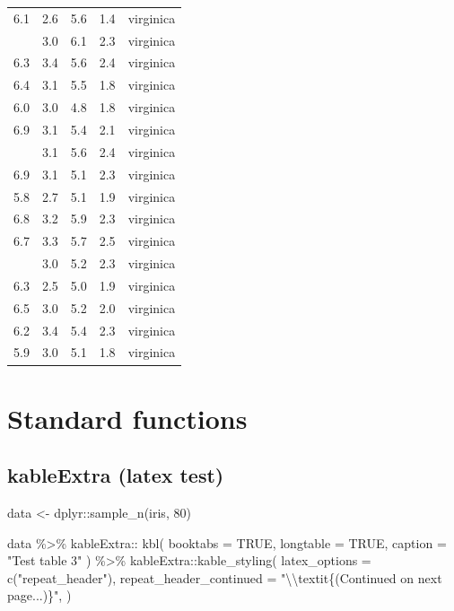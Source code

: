 \documentclass[
]{article}
\newenvironment{Shaded}{\begin{snugshade}}{\end{snugshade}}
\newcommand{\AttributeTok}[1]{\textcolor[rgb]{0.40,0.45,0.13}{#1}}
\newcommand{\ConstantTok}[1]{\textcolor[rgb]{0.56,0.35,0.01}{#1}}
\newcommand{\DecValTok}[1]{\textcolor[rgb]{0.68,0.00,0.00}{#1}}
\newcommand{\FunctionTok}[1]{\textcolor[rgb]{0.28,0.35,0.67}{#1}}
\newcommand{\NormalTok}[1]{\textcolor[rgb]{0.00,0.23,0.31}{#1}}
\newcommand{\OtherTok}[1]{\textcolor[rgb]{0.00,0.23,0.31}{#1}}
\newcommand{\SpecialCharTok}[1]{\textcolor[rgb]{0.37,0.37,0.37}{#1}}
\newcommand{\StringTok}[1]{\textcolor[rgb]{0.13,0.47,0.30}{#1}}
\begin{document}
\begin{longtable}[t]{lllll}
6.1 & 2.6 & 5.6 & 1.4 & virginica\\
\addlinespace
7.7 & 3.0 & 6.1 & 2.3 & virginica\\
6.3 & 3.4 & 5.6 & 2.4 & virginica\\
6.4 & 3.1 & 5.5 & 1.8 & virginica\\
6.0 & 3.0 & 4.8 & 1.8 & virginica\\
6.9 & 3.1 & 5.4 & 2.1 & virginica\\
\addlinespace
6.7 & 3.1 & 5.6 & 2.4 & virginica\\
6.9 & 3.1 & 5.1 & 2.3 & virginica\\
5.8 & 2.7 & 5.1 & 1.9 & virginica\\
6.8 & 3.2 & 5.9 & 2.3 & virginica\\
6.7 & 3.3 & 5.7 & 2.5 & virginica\\
\addlinespace
6.7 & 3.0 & 5.2 & 2.3 & virginica\\
6.3 & 2.5 & 5.0 & 1.9 & virginica\\
6.5 & 3.0 & 5.2 & 2.0 & virginica\\
6.2 & 3.4 & 5.4 & 2.3 & virginica\\
5.9 & 3.0 & 5.1 & 1.8 & virginica\\*
\end{longtable}
\endgroup{}

\hypertarget{standard-functions}{%
\section{Standard functions}\label{standard-functions}}

\hypertarget{kableextra-latex-test}{%
\subsection{kableExtra (latex test)}\label{kableextra-latex-test}}

\begin{Shaded}
\begin{Highlighting}[]
\NormalTok{data }\OtherTok{\textless{}{-}}\NormalTok{ dplyr}\SpecialCharTok{::}\FunctionTok{sample\_n}\NormalTok{(iris, }\DecValTok{80}\NormalTok{)}

\NormalTok{data }\SpecialCharTok{\%\textgreater{}\%} 
\NormalTok{  kableExtra}\SpecialCharTok{::} \FunctionTok{kbl}\NormalTok{(}
    \AttributeTok{booktabs =} \ConstantTok{TRUE}\NormalTok{,}
    \AttributeTok{longtable =} \ConstantTok{TRUE}\NormalTok{,}
    \AttributeTok{caption =} \StringTok{"Test table 3"}
\NormalTok{  ) }\SpecialCharTok{\%\textgreater{}\%} 
\NormalTok{  kableExtra}\SpecialCharTok{::}\FunctionTok{kable\_styling}\NormalTok{(}
    \AttributeTok{latex\_options =} \FunctionTok{c}\NormalTok{(}\StringTok{"repeat\_header"}\NormalTok{),}
    \AttributeTok{repeat\_header\_continued =} \StringTok{"}\SpecialCharTok{\textbackslash{}\textbackslash{}}\StringTok{textit\{(Continued on next page...)\}"}\NormalTok{,}
\NormalTok{    )}
\end{Highlighting}
\end{Shaded}
\end{document}
